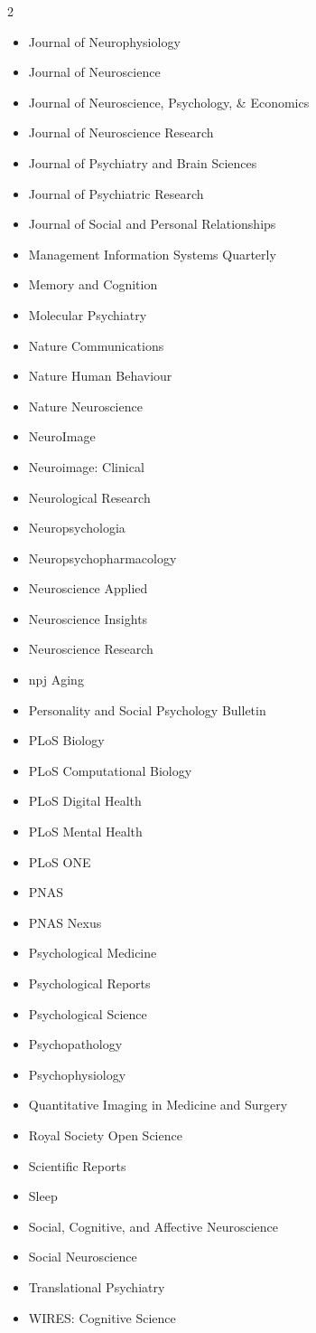 \documentclass[11pt, letterpaper]{article}
\begin{document}
\begin{multicols}{2}
\begin{itemize}[noitemsep]
\item Journal of Neurophysiology
\item Journal of Neuroscience 
\item Journal of Neuroscience, Psychology, \& Economics
\item Journal of Neuroscience Research
\item Journal of Psychiatry and Brain Sciences
\item Journal of Psychiatric Research
\item Journal of Social and Personal Relationships
\item Management Information Systems Quarterly 
\item Memory and Cognition
\item Molecular Psychiatry
\item Nature Communications 
\item Nature Human Behaviour 
\item Nature Neuroscience
\item NeuroImage 
\item Neuroimage: Clinical 
\item Neurological Research
\item Neuropsychologia 
\item Neuropsychopharmacology 
\item Neuroscience Applied
\item Neuroscience Insights
\item Neuroscience Research 
\item npj Aging
\item Personality and Social Psychology Bulletin
\item PLoS Biology 
\item PLoS Computational Biology 
\item PLoS Digital Health 
\item PLoS Mental Health
\item PLoS ONE 
\item PNAS
\item PNAS Nexus
\item Psychological Medicine 
\item Psychological Reports
\item Psychological Science 
\item Psychopathology 
\item Psychophysiology
\item Quantitative Imaging in Medicine and Surgery
\item Royal Society Open Science
\item Scientific Reports 
\item Sleep
\item Social, Cognitive, and Affective Neuroscience 
\item Social Neuroscience
\item Translational Psychiatry
\item WIRES: Cognitive Science

\end{itemize}
\end{multicols}
\end{document}
